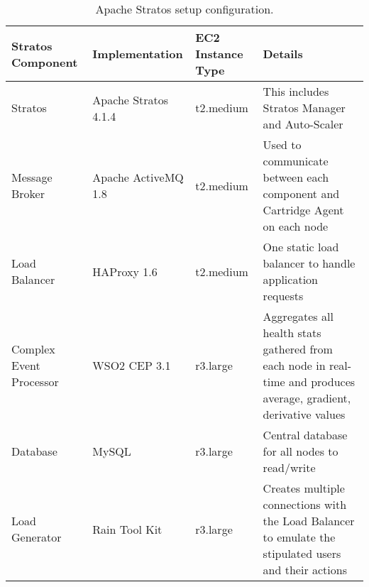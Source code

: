 \begin{table}[h!]
\centering
\caption{Apache Stratos setup configuration.}
\label{tab:stratos_config}
    \begin{tabular}{ | p{1cm} | p{2cm} | p{1cm}| p{3cm}|}
    \hline
    Stratos Component & Implementation & EC2 Instance Type & Details \\ \hline
    Stratos & Apache Stratos 4.1.4 & t2.medium & This includes Stratos Manager and Auto-Scaler \\ \hline
    
    Message Broker & Apache ActiveMQ 1.8 & t2.medium & Used to communicate between each component and Cartridge Agent on each node \\ \hline
    
    Load Balancer & HAProxy 1.6 & t2.medium & One static load balancer to handle application requests \\    \hline
    
    Complex Event Processor & WSO2 CEP 3.1 & r3.large & Aggregates all health stats gathered from each node in real-time and produces average, gradient, derivative values \\    \hline
    
    Database & MySQL & r3.large & Central database for all nodes to read/write \\    \hline
    
    Load Generator & Rain Tool Kit & r3.large & Creates multiple connections with the Load Balancer to emulate the stipulated users and their actions \\    \hline
    \end{tabular}
    
\end{table}